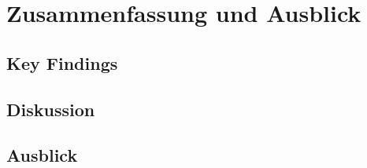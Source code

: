 
\chapter{Zusammenfassung und Ausblick} \label{chap:fazit}

\section{Key Findings}
\section{Diskussion}
\section{Ausblick}